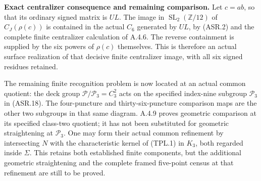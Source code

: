 \par\medskip\noindent\textbf{Exact centralizer consequence and remaining comparison.}
Let $c=ab$, so that its ordinary signed matrix is $UL$.
The image in $\operatorname{SL}_2(\mathbb Z/12)$ of
$C_J(\rho(c))$ is contained in the actual $C_6$
generated by $UL$, by (ASR.2) and the complete finite
centralizer calculation of A.4.6.
The reverse containment is supplied by the six powers of
$\rho(c)$ themselves.  This is therefore an actual
surface realization of that decisive finite centralizer
image, with all six signed residues retained.

The remaining finite recognition problem is now located
at an actual common quotient: the deck group
$\mathcal P/\mathcal P_3=C_3^2$ acts on the specified
index-nine subgroup $\mathcal P_3$ in (ASR.18).
The four-puncture and thirty-six-puncture comparison maps
are the other two subgroups in that same diagram.
A.4.9 proves geometric comparison at its specified
class-two quotient; it has not been substituted for
geometric straightening at $\mathcal P_3$.
One may form their actual common refinement by
intersecting $N$ with the characteristic kernel of
(TPL.1) in $K_3$, both regarded inside $\Sigma$.
This retains both established finite components, but
the additional geometric straightening and the
complete framed five-point census at that refinement
are still to be proved.
